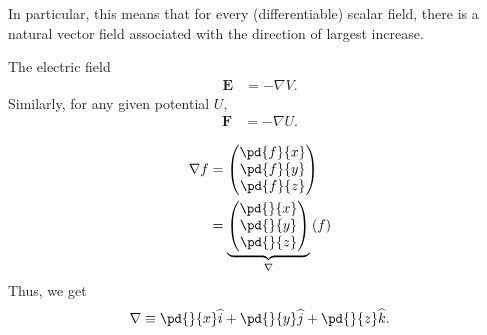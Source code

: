 \documentclass[10pt]{mypackage}
\begin{document}
In particular, this means that for every (differentiable) scalar field, there is a natural vector field associated with the direction of largest increase.
\begin{example}
  The electric field
  \begin{align*}
    \mathbf{E} &= -\nabla V.
  \end{align*}
  Similarly, for any given potential $U$, 
  \begin{align*}
    \mathbf{F} &= -\nabla U.
  \end{align*}
\end{example}
\begin{definition}
  \begin{align*}
    \nabla f &= \begin{pmatrix}\pd{f}{x}\\\pd{f}{y}\\\pd{f}{z}\end{pmatrix}\\
             &= \underbrace{\begin{pmatrix}\pd{}{x}\\\pd{}{y}\\\pd{}{z}\end{pmatrix}}_{\nabla} \left(f\right)
  \end{align*}
  Thus, we get
  \begin{align*}
    \nabla \equiv \pd{}{x}\widehat{i} + \pd{}{y}\widehat{j} + \pd{}{z}\widehat{k}.
  \end{align*}
\end{definition}
\end{document}
